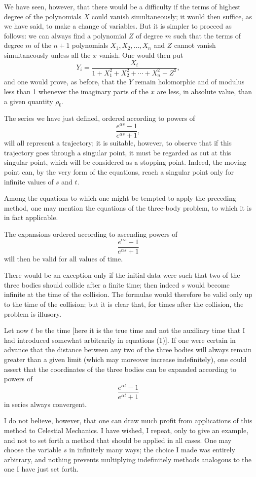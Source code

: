 \documentclass[11pt]{article}
\begin{document}
We have seen, however, that there would be a difficulty if the terms of highest degree of the polynomials $X$ could vanish simultaneously; it would then suffice, as we have said, to make a change of variables. But it is simpler to proceed as follows: we can always find a polynomial $Z$ of degree $m$ such that the terms of degree $m$ of the $n+1$ polynomials $X_1,X_2,\ldots,X_n$ and $Z$ cannot vanish simultaneously unless all the $x$ vanish. One would then put
\[
Y_i=\frac{X_i}{1+X_1^2+X_2^2+\cdots+X_n^2+Z^2},
\]
and one would prove, as before, that the $Y$ remain holomorphic and of modulus less than 1 whenever the imaginary parts of the $x$ are less, in absolute value, than a given quantity $\rho_0$.

The series we have just defined, ordered according to powers of
\[
\frac{e^{\alpha s}-1}{e^{\alpha s}+1},
\]
will all represent a trajectory; it is suitable, however, to observe that if this trajectory goes through a singular point, it must be regarded as cut at this singular point, which will be considered as a stopping point. Indeed, the moving point can, by the very form of the equations, reach a singular point only for infinite values of $s$ and $t$.

Among the equations to which one might be tempted to apply the preceding method, one may mention the equations of the three-body problem, to which it is in fact applicable.

The expansions ordered according to ascending powers of
\[
\frac{e^{\alpha s}-1}{e^{\alpha s}+1}
\]
will then be valid for all values of time.

There would be an exception only if the initial data were such that two of the three bodies should collide after a finite time; then indeed $s$ would become infinite at the time of the collision. The formulae would therefore be valid only up to the time of the collision; but it is clear that, for times after the collision, the problem is illusory.

Let now $t$ be the time [here it is the true time and not the auxiliary time that I had introduced somewhat arbitrarily in equations (1)]. If one were certain in advance that the distance between any two of the three bodies will always remain greater than a given limit (which may moreover increase indefinitely), one could assert that the coordinates of the three bodies can be expanded according to powers of
\[
\frac{e^{\alpha t}-1}{e^{\alpha t}+1}
\]
in series always convergent.

I do not believe, however, that one can draw much profit from applications of this method to Celestial Mechanics. I have wished, I repeat, only to give an example, and not to set forth a method that should be applied in all cases. One may choose the variable $s$ in infinitely many ways; the choice I made was entirely arbitrary, and nothing prevents multiplying indefinitely methods analogous to the one I have just set forth.
\end{document}
